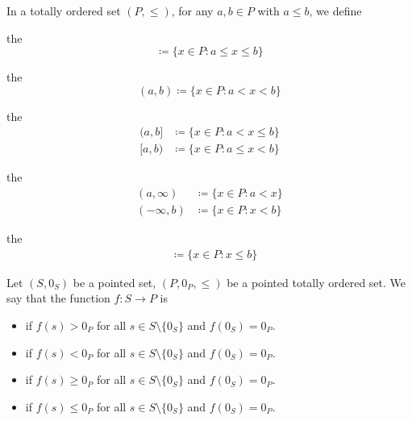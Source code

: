 \begin{definition}\label{def:total_order_interval}\cite{nLab:order_topology}
  In a totally ordered set \( (P, \leq) \), for any \( a, b \in P \) with \( a \leq b \), we define
  \begin{defenum}
     the 
    \begin{equation*}
      [a, b] \coloneqq \{ x \in P \colon a \leq x \leq b \}
    \end{equation*}

     the 
    \begin{equation*}
      (a, b) \coloneqq \{ x \in P \colon a < x < b \}
    \end{equation*}

     the 
    \begin{align*}
      (a, b] &\coloneqq \{ x \in P \colon a < x \leq b \}
      \\
      [a, b) &\coloneqq \{ x \in P \colon a \leq x < b \}
    \end{align*}

     the 
    \begin{align*}
      (a, \infty) &\coloneqq \{ x \in P \colon a < x \}
      \\
      (-\infty, b) &\coloneqq \{ x \in P \colon x < b \}
    \end{align*}

     the 
    \begin{align*}
      [a, \infty) &\coloneqq \{ x \in P \colon a \leq x \}
      \\
      (-\infty, b] &\coloneqq \{ x \in P \colon x \leq b \}
    \end{align*}
  \end{defenum}
\end{definition}

\begin{definition}\label{def:function_definiteness}
  Let \( (S, 0_S) \) be a pointed set, \( (P, 0_P, \leq) \) be a pointed totally ordered set. We say that the function \( f: S \to P \) is
  \begin{itemize}
    \item {} if \( f(s) > 0_P \) for all \( s \in S \setminus \{ 0_S \} \) and \( f(0_S) = 0_P \).
    \item {} if \( f(s) < 0_P \) for all \( s \in S \setminus \{ 0_S \} \) and \( f(0_S) = 0_P \).
    \item {} if \( f(s) \geq 0_P \) for all \( s \in S \setminus \{ 0_S \} \) and \( f(0_S) = 0_P \).
    \item {} if \( f(s) \leq 0_P \) for all \( s \in S \setminus \{ 0_S \} \) and \( f(0_S) = 0_P \).
  \end{itemize}
\end{definition}

